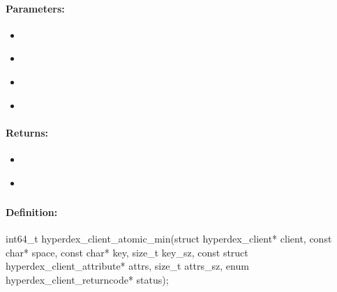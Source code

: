 \paragraph{Parameters:}
\begin{itemize}[noitemsep]
\item {}\\

\item {}\\

\item {}\\

\item {}\\

\end{itemize}

\paragraph{Returns:}
\begin{itemize}[noitemsep]
\item {}\\

\item {}\\

\end{itemize}

\pagebreak
\subsubsection{}
\label{api:c:atomic_min}


\paragraph{Definition:}
\begin{ccode}
int64_t hyperdex_client_atomic_min(struct hyperdex_client* client,
        const char* space,
        const char* key, size_t key_sz,
        const struct hyperdex_client_attribute* attrs, size_t attrs_sz,
        enum hyperdex_client_returncode* status);
\end{ccode}

